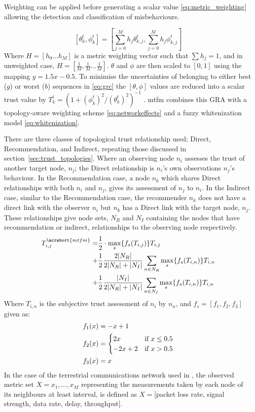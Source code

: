 Weighting can be applied before generating a scalar value \eqref{eq:metric_weighting} allowing the detection and classification of misbehaviours.

%
\begin{equation}
  \label{eq:metric_weighting}
  [\theta_k^t, \phi_k^t] = \left[\sum_{j=0}^M h_j \theta_{k,j}^t,\sum_{j=0}^M h_j \phi_{k,j}^t \right]
\end{equation}
%
Where $H=[h_0\dots h_M]$ is a metric weighting vector such that $\sum h_j = 1$, and in unweighted case, $H=[\frac{1}{M},\frac{1}{M}\dots\frac{1}{M}]$.
$\theta$ and $\phi$ are then scaled to $[0,1]$ using the mapping $y = 1.5 x - 0.5$.
To minimise the uncertainties of belonging to either best ($g$) or worst ($b$) sequences in \eqref{eq:grc} the $[\theta,\phi]$ values are reduced into a scalar trust value by $T_k^t = ({1+{(\phi_k^t)^2}/{(\theta_k^t)^2}})^{-1}$ \cite{Hong2010}.
\acrshort{mtfm} combines this GRA with a topology-aware weighting scheme \eqref{eq:networkeffects} and a fuzzy whitenization model \eqref{eq:whitenization}.

There are three classes of topological trust relationship used; Direct, Recommendation, and Indirect, repeating those discussed in section~\ref{sec:trust_topologies}.
Where an observing node $n_i$ assesses the trust of another target node, $n_j$; the Direct relationship is $n_i$'s own observations $n_j$'s behaviour.
In the Recommendation case, a node $n_k$ which shares Direct relationships with both $n_i$ and $n_j$, gives its assessment of $n_j$ to $n_i$.
In the Indirect case, similar to the Recommendation case, the recommender $n_k$ does not have a direct link with the observer $n_i$ but $n_k$ has a Direct link with the target node, $n_j$.
These relationships give node sets, $N_R$ and $N_I$ containing the nodes that have recommendation or indirect, relationships to the observing node respectively.
%
\begin{align}
  \label{eq:networkeffects}
  T_{i,j}^{\acrshort{mtfm}}=&\frac{1}{2} \cdot \max_s\{f_s(T_{i,j})\} T_{i,j}\\ \notag
  +&\frac{1}{2} \frac{2|N_R| }{2|N_R| + |N_I|}\sum_{n \in N_R} \max_s\{f_s(T_{i,n})\} T_{i,n}\\ \notag
  +&\frac{1}{2} \frac{|N_I| }{2|N_R| + |N_I|}\sum_{n \in N_I} \max_s\{f_s(T_{i,n})\} T_{i,n} 
\end{align}
Where $T_{i,n}$ is the subjective trust assessment of $n_i$ by $n_n$, and $f_s = [ f_1,f_2, f_3]$ given as:
\begin{align}
  \label{eq:whitenization}
  f_1(x)&= -x+1\notag\\
  f_2(x)&= 
  \begin{cases}
    2x & \text{if }x\leq 0.5\\
    -2x+2 & \text{if }x>0.5
  \end{cases}\\
  f_3(x)&= x\notag
\end{align}
%
In the case of the terrestrial communications network used in \cite{Guo11}, the observed metric set $X = {x_1,\dots,x_M}$ representing the measurements taken by each node of its neighbours at least interval, is defined as $X=[$packet loss rate, signal strength, data rate, delay, throughput$]$.

